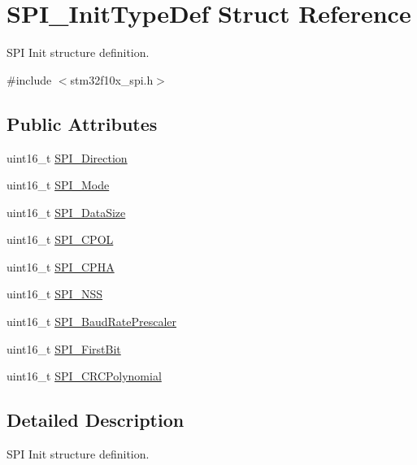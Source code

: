 \hypertarget{structSPI__InitTypeDef}{
\section{SPI\_\-InitTypeDef Struct Reference}
\label{structSPI__InitTypeDef}
}


SPI Init structure definition.  




{\ttfamily \#include $<$stm32f10x\_\-spi.h$>$}

\subsection*{Public Attributes}
\begin{DoxyCompactItemize}
\item 
uint16\_\-t \hyperlink{structSPI__InitTypeDef_a8cf0fefa76b9238a41997db14eac62a9}{SPI\_\-Direction}
\item 
uint16\_\-t \hyperlink{structSPI__InitTypeDef_a578435d3b3a17baa5d5ff87447aa697f}{SPI\_\-Mode}
\item 
uint16\_\-t \hyperlink{structSPI__InitTypeDef_a0e63950d46a6483f9b7048b8c97800b8}{SPI\_\-DataSize}
\item 
uint16\_\-t \hyperlink{structSPI__InitTypeDef_a1fe46794d91fd950e06da06b0e488997}{SPI\_\-CPOL}
\item 
uint16\_\-t \hyperlink{structSPI__InitTypeDef_acdaac9259c45f137e804f90122edb129}{SPI\_\-CPHA}
\item 
uint16\_\-t \hyperlink{structSPI__InitTypeDef_a6c1ea4b5e3d147b74799efa42e3903c6}{SPI\_\-NSS}
\item 
uint16\_\-t \hyperlink{structSPI__InitTypeDef_adfcf6178b6a117643111c13403f32e71}{SPI\_\-BaudRatePrescaler}
\item 
uint16\_\-t \hyperlink{structSPI__InitTypeDef_ace7ca292c290953f8a6ae86f79949f5b}{SPI\_\-FirstBit}
\item 
uint16\_\-t \hyperlink{structSPI__InitTypeDef_aee6460416ade6c4016aac2bd64cae0eb}{SPI\_\-CRCPolynomial}
\end{DoxyCompactItemize}


\subsection{Detailed Description}
SPI Init structure definition. 

